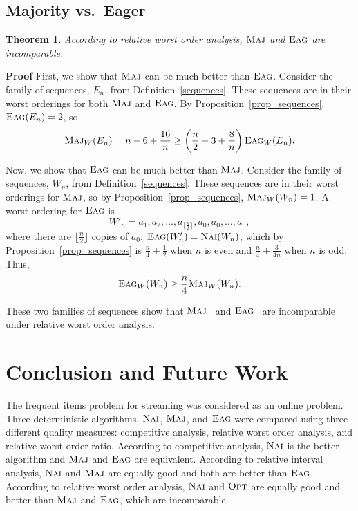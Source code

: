 \documentclass[11pt]{article}
\newtheorem{xtheorem}{Theorem}
\newenvironment{theorem}{\begin{xtheorem}\rm}{\end{xtheorem}}
\newenvironment{proof}{\begin{trivlist}\item[]{\bf Proof }}{\hspace*{\fill}\raisebox{-1pt}{\boldmath$\Box$}\end{trivlist}}
\newcommand{\opt}{{\ensuremath{\textsc{Opt}}}\xspace}
\newcommand{\maj}{{\ensuremath{\textsc{Maj}}}\xspace}
\newcommand{\nav}{{\ensuremath{\textsc{Nai}}}\xspace}
\newcommand{\eag}{{\ensuremath{\textsc{Eag}}}\xspace}
\begin{document}
\subsection{Majority vs.\ Eager}

\begin{theorem}\label{thm:relwor_maj_eag}
According to relative worst order analysis, \maj and \eag are incomparable.
\end{theorem}
\begin{proof}
First, we show that \maj can be much better than \eag.
Consider the family of sequences, $E_n$, from Definition~\ref{sequences}. These sequences are in their worst orderings
for both \maj and \eag. By Proposition~\ref{prop_sequences}, $\eag(E_n) = 2$, so $$\maj_W(E_n) = n-6+\frac{16}{n} \geq \left(\frac{n}{2}-3+\frac{8}{n}\right)\eag_W(E_n).$$

Now, we show that \eag can be much better than \maj.
Consider the family of sequences, $W_n$, from Definition~\ref{sequences}. These sequences are in their worst orderings
for \maj, so by Proposition~\ref{prop_sequences}, $\maj_W(W_n) = 1$. A worst ordering for \eag is
$$W'_n = a_1,a_2,\ldots,a_{\lceil\frac{n}{2}\rceil},a_0,a_0,\ldots,a_0,$$ where there
are $\lfloor \frac{n}{2} \rfloor$ copies of $a_0$. $\eag(W'_n) = \nav(W_n)$, which by Proposition~\ref{prop_sequences}
 is $\frac{n}{4} + \frac{1}{2}$ when $n$ is even and $\frac{n}{4} + \frac{3}{4n}$ when $n$ is odd.
Thus, $$\eag_W(W_n) \geq \frac{n}{4}\maj_W(W_n).$$

These two families of sequences show that \maj~ and \eag~ are incomparable under relative worst order analysis.

\end{proof}










\section{Conclusion and Future Work}
The frequent items problem for streaming was considered as an online
problem. Three deterministic algorithms, \nav, \maj, and \eag were
compared using three different quality measures: competitive analysis,
relative worst order analysis, and relative worst order ratio. According
to competitive analysis, \nav is the better algorithm and \maj and
\eag are equivalent. According to relative interval analysis, \nav
and \maj are equally good and both are better than \eag. According
to relative worst order analysis, \nav and \opt are equally good
and better than \maj and \eag, which are incomparable.
\end{document}
